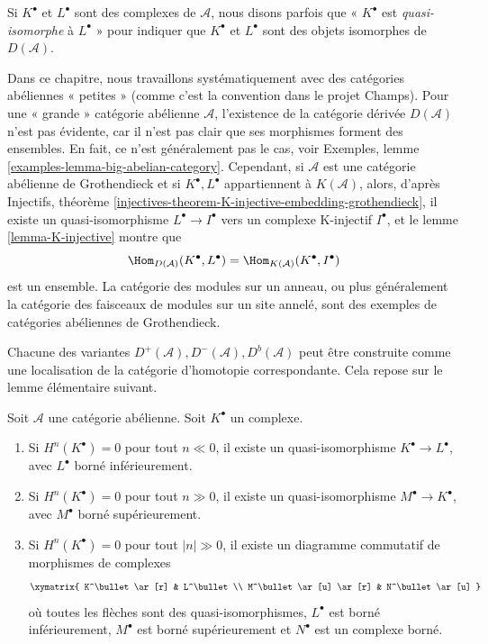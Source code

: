 \noindent
Si $K^\bullet$ et $L^\bullet$ sont des complexes de $\mathcal{A}$, nous disons
parfois que « $K^\bullet$ est {\it quasi-isomorphe} à $L^\bullet$ » pour
indiquer que $K^\bullet$ et $L^\bullet$ sont des objets isomorphes de
$D(\mathcal{A})$.

\begin{remark}
\label{remark-existence-derived}
Dans ce chapitre, nous travaillons systématiquement avec des catégories
abéliennes « petites » (comme c'est la convention dans le projet Champs). Pour
une « grande » catégorie abélienne $\mathcal{A}$, l'existence de la catégorie
dérivée $D(\mathcal{A})$ n'est pas évidente, car il n'est pas clair que ses
morphismes forment des ensembles. En fait, ce n'est généralement pas le cas,
voir Exemples, lemme \ref{examples-lemma-big-abelian-category}. Cependant, si
$\mathcal{A}$ est une catégorie abélienne de Grothendieck et si
$K^\bullet, L^\bullet$ appartiennent à $K(\mathcal{A})$, alors, d'après
Injectifs, théorème
\ref{injectives-theorem-K-injective-embedding-grothendieck}, il existe un
quasi-isomorphisme $L^\bullet \to I^\bullet$ vers un complexe K-injectif
$I^\bullet$, et le lemme \ref{lemma-K-injective} montre que
$$
\Hom_{D(\mathcal{A})}(K^\bullet, L^\bullet) =
\Hom_{K(\mathcal{A})}(K^\bullet, I^\bullet)
$$
est un ensemble. La catégorie des modules sur un anneau, ou plus généralement
la catégorie des faisceaux de modules sur un site annelé, sont des exemples de
catégories abéliennes de Grothendieck.
\end{remark}

\noindent
Chacune des variantes
$D^{+}(\mathcal{A}), D^{-}(\mathcal{A}), D^b(\mathcal{A})$ peut être construite
comme une localisation de la catégorie d'homotopie correspondante. Cela repose
sur le lemme élémentaire suivant.

\begin{lemma}
\label{lemma-complex-cohomology-bounded}
Soit $\mathcal{A}$ une catégorie abélienne. Soit $K^\bullet$ un complexe.
\begin{enumerate}
\item Si $H^n(K^\bullet) = 0$ pour tout $n \ll 0$, il existe un
quasi-isomorphisme $K^\bullet \to L^\bullet$, avec $L^\bullet$ borné
inférieurement.
\item Si $H^n(K^\bullet) = 0$ pour tout $n \gg 0$, il existe un
quasi-isomorphisme $M^\bullet \to K^\bullet$, avec $M^\bullet$ borné
supérieurement.
\item Si $H^n(K^\bullet) = 0$ pour tout $|n| \gg 0$, il existe un diagramme
commutatif de morphismes de complexes
$$
\xymatrix{
K^\bullet \ar[r] & L^\bullet \\
M^\bullet \ar[u] \ar[r] & N^\bullet \ar[u]
}
$$
où toutes les flèches sont des quasi-isomorphismes, $L^\bullet$ est borné
inférieurement, $M^\bullet$ est borné supérieurement et $N^\bullet$ est un
complexe borné.
\end{enumerate}
\end{lemma}


